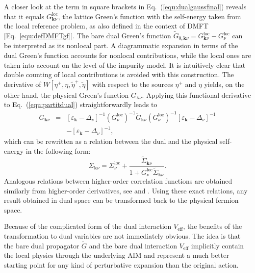 \documentclass[rmp,aps,reprint,amsmath,amssymb,superscriptaddress,showpacs,nofootinbib]{revtex4-1}
\begin{document}
A closer look at the term in square brackets in Eq.~(\ref{equ:dualgaussfinal}) reveals that it equals  $G^\text{loc}_{{\mathbf k}\nu}$, the lattice Green's function with the self-energy taken from the local reference problem, as also defined in the context of DMFT [Eq.~\eqref{equ:defDMFTgf}]. The bare dual Green's function $\widetilde{G}_{0,\mathbf{k}\nu}=G^\text{loc}_{{\mathbf k}\nu}-G^\text{loc}_{\nu}$ can be interpreted as its nonlocal part. A diagrammatic expansion in terms of the dual Green's function accounts for nonlocal contributions, while the local ones are taken into account on the level of the impurity model. It is intuitively clear that double counting of local contributions is avoided with this construction. The derivative of $W[\eta^+,\eta,\widetilde{\eta}^+,\widetilde{\eta}]$ with respect to the sources $\eta^{+}$ and $\eta$ yields, on the other hand, the physical Green's function $G_{\mathbf{k}\nu}$. Applying this functional derivative to Eq.~(\ref{equ:partitdual}) straightforwardly leads to
\begin{eqnarray}
G_{\mathbf{k}\nu} &=& [\varepsilon_{\mathbf{k}}-\Delta_{\nu}]^{-1}(G^\text{loc}_\nu)^{-1}\widetilde{G}_{\mathbf{k}\nu}(G^\text{loc}_\nu)^{-1}[\varepsilon_{\mathbf{k}}-\Delta_{\nu}]^{-1}\nonumber\\&& -[\varepsilon_{\mathbf{k}}-\Delta_{\nu}]^{-1},
\label{equ:relationrealdual}
\end{eqnarray}
which can be rewritten as a relation between the dual and the physical self-energy in the following form:
\begin{equation}
 \label{equ:relationrealdualsigma}
 \Sigma_{\mathbf{k}\nu}=\Sigma_{\nu}^{\text{loc}}+\frac{\widetilde{\Sigma}_{\mathbf{k}\nu}}{1+G^{\text{loc}}_{\nu}\widetilde{\Sigma}_{\mathbf{k}\nu}}.
\end{equation}
Analogous relations between higher-order correlation functions are obtained similarly from higher-order derivatives, see  and . Using these exact relations, any result obtained in dual space can be transformed back to the physical fermion space.

Because of the complicated form of the dual interaction $V_{\text{eff}}$, the benefits of the transformation to dual variables are not immediately obvious. The idea is that the bare dual propagator $\widetilde{G}$ and the bare dual interaction $V_{\text{eff}}$ implicitly contain the local physics through the underlying AIM and  represent a much better starting point for any kind of perturbative expansion than the original action.
\end{document}
